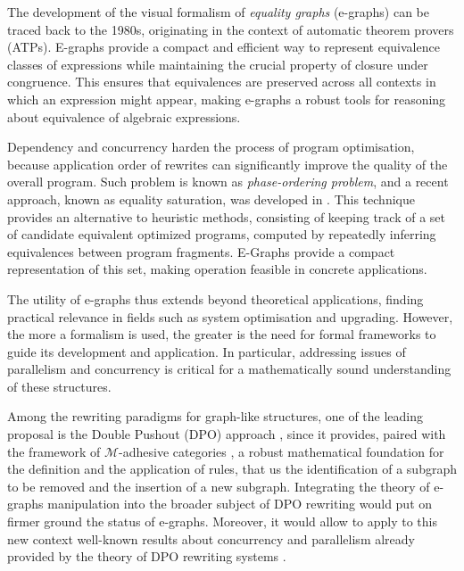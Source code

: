 The development of the visual formalism of \emph{equality graphs} (e-graphs) can be traced back to the 1980s, originating in the context of automatic theorem provers (ATPs). E-graphs provide a compact and efficient way to represent equivalence classes of expressions while maintaining the crucial property of closure under congruence. This ensures that equivalences are preserved across all contexts in which an expression might appear, making e-graphs a robust tools for reasoning about equivalence of algebraic expressions.

Dependency and concurrency harden the process of program optimisation, because application order of rewrites can significantly improve the quality of the overall program.
Such problem is known as \textit{phase-ordering problem}, and a recent approach, known as equality saturation, was developed in \cite{Tate_2011}.
This technique provides an alternative to heuristic methods, consisting of keeping track of a set of candidate equivalent optimized programs, 
computed by repeatedly inferring equivalences between program fragments.
E-Graphs provide a compact representation of this set, making operation feasible in concrete applications.

The utility of e-graphs thus extends beyond theoretical applications, finding practical relevance in fields such as system optimisation and upgrading.
%
However, the more a formalism is used, the greater is the need for formal frameworks to guide its development and application. In particular, addressing issues of parallelism and concurrency is critical for 
a mathematically 
sound understanding of these structures.

Among the rewriting paradigms for graph-like structures, one of the leading proposal is the Double Pushout (DPO) approach \cite{Ehrig_Golas,ehrig2006fundamentals}, since it provides, paired with the framework of $\mathcal{M}$-adhesive  categories \cite{lack2005adhesive,azzi2019essence,behr2022fundamentals}, a robust mathematical foundation for the definition and the application of rules,
that us the identification of a subgraph to be removed and the insertion of a new subgraph.
%
Integrating the theory of e-graphs manipulation into the broader subject of DPO rewriting would put on firmer ground the status of e-graphs. Moreover, it would allow to apply to this new context well-known results about concurrency and parallelism already provided by the theory of DPO rewriting systems \cite{baldan1999concurrent,ehrig1999handbook}. 
 
